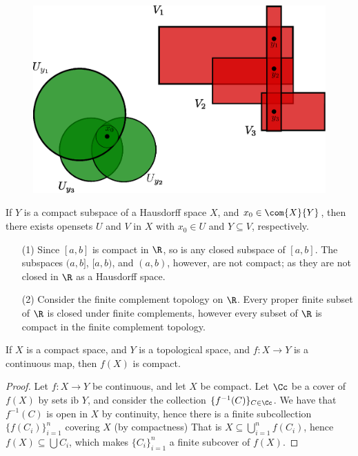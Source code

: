 \begin{figure}[h]
    \centering
    \includegraphics[scale=0.5]{Figures/Chapter3/compact_hausdorf_space.eps}
    \caption{}
    \label{fig_3.1}
\end{figure}

\begin{corollary}
    If $Y$ is a compact subspace of a Hausdorff space $X$, and  $ x_0 \in \com{X}{Y}$, then there
    exists opensets $U$ and  $V$ in  $X$ with  $ x_0 \in U$ and $Y \subseteq V$, respectively.
\end{corollary}

\begin{example}
    \begin{enumerate}
        \item[(1)] Since $[a,b]$ is compact in $\R$, so is any closed subspace of  $[a,b]$. The
            subspaces $(a,b]$, $[a,b)$, and $(a,b)$, however, are not compact; as they are not
            closed in $\R$ as a Hausdorff space.

        \item [(2)] Consider the finite complement topology on $\R$. Every proper finite subset of
            $\R$ is closed under finite complements, however every subset of  $\R$ is compact in the
            finite complement topology.
    \end{enumerate}
\end{example}

\begin{theorem}\label{3.4.4}
    If $X$ is a compact space, and  $Y$ is a topological space, and  $f:X \rightarrow Y$ is a
    continuous map, then $f(X)$ is compact.
\end{theorem}
\begin{proof}
    Let $f:X \rightarrow Y$ be continuous, and let $X$ be compact. Let  $\Cc$ be a cover of  $f(X)$
    by sets ib $Y$, and consider the collection  $\{f^{-1}(C)\}_{C \in \Cc}$. We have that
    $f^{-1}(C)$ is open in $X$ by continuity, hence there is a finite subcollection
    $\{f(C_i)\}_{i=1}^n$ covering $X$  (by compactness) That is $X \subseteq
    \bigcup_{i=1}^n{f(C_i)}$, hence $f(X) \subseteq \bigcup{C_i}$, which makes $\{C_i\}_{i=1}^n$ a
    finite subcover of $f(X)$.
\end{proof}

